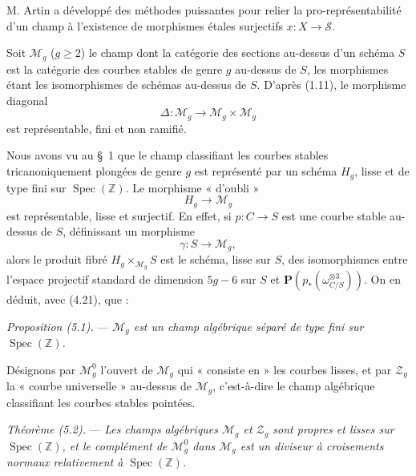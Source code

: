 \documentclass[10pt]{article}
\newcommand{\Spec}{\operatorname{Spec}}
\newcommand{\PP}{\mathbf P}
\begin{document}
M. Artin a développé des méthodes puissantes pour relier la pro-représentabilité d'un champ à l'existence de morphismes étales surjectifs $x:X\to\mathscr S$.

\medskip
{}

Soit $\mathcal M_g$ ($g\geq 2$) le champ dont la catégorie des sections au-dessus d'un schéma $S$ est la catégorie des courbes stables de genre $g$ au-dessus de $S$, les morphismes étant les isomorphismes de schémas au-dessus de $S$. D'après (1.11), le morphisme diagonal
\[
\Delta:\mathcal M_g\longrightarrow \mathcal M_g\times\mathcal M_g
\]
est représentable, fini et non ramifié.

Nous avons vu au \S~1 que le champ classifiant les courbes stables tricanoniquement plongées de genre $g$ est représenté par un schéma $H_g$, lisse et de type fini sur $\Spec(\mathbb Z)$. Le morphisme « d'oubli »
\[
H_g\longrightarrow \mathcal M_g
\]
est représentable, lisse et surjectif. En effet, si $p:C\to S$ est une courbe stable au-dessus de $S$, définissant un morphisme
\[
\gamma:S\longrightarrow \mathcal M_g,
\]
alors le produit fibré $H_g\times_{\mathcal M_g}S$ est le schéma, lisse sur $S$, des isomorphismes entre l'espace projectif standard de dimension $5g-6$ sur $S$ et $\PP(p_*(\omega_{C/S}^{\otimes 3}))$. On en déduit, avec (4.21), que :

\medskip
\noindent\emph{Proposition (5.1).} --- \emph{$\mathcal M_g$ est un champ algébrique séparé de type fini sur $\Spec(\mathbb Z)$.}

Désignons par $\mathcal M_g^0$ l'ouvert de $\mathcal M_g$ qui « consiste en » les courbes lisses, et par $\mathcal Z_g$ la « courbe universelle » au-dessus de $\mathcal M_g$, c'est-à-dire le champ algébrique classifiant les courbes stables pointées.

\medskip
\noindent\emph{Théorème (5.2).} --- \emph{Les champs algébriques $\mathcal M_g$ et $\mathcal Z_g$ sont propres et lisses sur $\Spec(\mathbb Z)$, et le complément de $\mathcal M_g^0$ dans $\mathcal M_g$ est un diviseur à croisements normaux relativement à $\Spec(\mathbb Z)$.}
\end{document}
